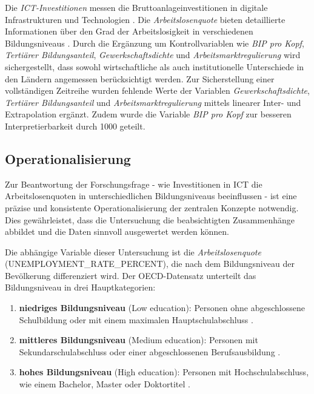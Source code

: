 Die \textit{\ac{ICT}-Investitionen} messen die Bruttoanlageinvestitionen in digitale 
Infrastrukturen und Technologien \parencite{oecd2022ict}. Die \textit{Arbeitslosenquote} 
bieten detaillierte Informationen über den Grad der Arbeitslosigkeit in verschiedenen 
Bildungsniveaus \parencite{oecd2022unemployment}. Durch die Ergänzung um Kontrollvariablen 
wie \textit{\ac{BIP} pro Kopf}, \textit{Tertiärer Bildungsanteil}, \textit{Gewerkschaftsdichte} 
und \textit{Arbeitsmarktregulierung} wird sichergestellt, dass sowohl wirtschaftliche als auch 
institutionelle Unterschiede in den Ländern angemessen berücksichtigt werden. Zur Sicherstellung 
einer vollständigen Zeitreihe wurden fehlende Werte der Variablen \textit{Gewerkschaftsdichte}, 
\textit{Tertiärer Bildungsanteil} und \textit{Arbeitsmarktregulierung} mittels linearer Inter- 
und Extrapolation ergänzt. Zudem wurde die Variable \textit{\ac{BIP} pro Kopf} zur besseren 
Interpretierbarkeit durch 1000 geteilt.


\subsection{Operationalisierung}

Zur Beantwortung der Forschungsfrage - wie Investitionen in \ac{ICT} die Arbeitslosenquoten 
in unterschiedlichen Bildungsniveaus beeinflussen - ist eine präzise und konsistente 
Operationalisierung der zentralen Konzepte notwendig. Dies gewährleistet, dass die 
Untersuchung die beabsichtigten Zusammenhänge abbildet und die Daten sinnvoll ausgewertet 
werden können.

Die abhängige Variable dieser Untersuchung ist die \textit{Arbeitslosenquote} 
(UNEMPLOYMENT\_RATE\_PERCENT), die nach dem Bildungsniveau der Bevölkerung differenziert 
wird. Der \ac{OECD}-Datensatz unterteilt das Bildungsniveau in drei Hauptkategorien:

\begin{enumerate}

    \item \textbf{niedriges Bildungsniveau} (Low education): Personen ohne abgeschlossene 
    Schulbildung oder mit einem maximalen Hauptschulabschluss \parencite{oecd2022unemployment}.

    \item \textbf{mittleres Bildungsniveau} (Medium education): Personen mit 
    Sekundarschulabschluss oder einer abgeschlossenen Berufsausbildung 
    \parencite{oecd2022unemployment}.

    \item \textbf{hohes Bildungsniveau} (High education): Personen mit Hochschulabschluss, wie 
    einem Bachelor, Master oder Doktortitel \parencite{oecd2022unemployment}.

\end{enumerate}

